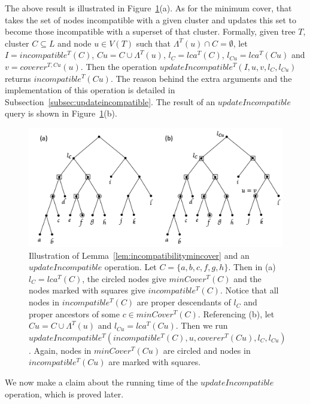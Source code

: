 \documentclass{article}
\newcommand{\leafset}{\Lambda}
\begin{document}
    The above result is illustrated in Figure~\ref{fig:incompatibility}(a). As for the minimum cover, that takes the set of nodes incompatible with a given cluster and updates this set to become those incompatible with a superset of that cluster. Formally, given tree $T$, cluster $C \subseteq L$ and node $u \in V(T)$ such that $\leafset^{T}(u) \cap C = \emptyset$, let $I = incompatible^{T}(C)$, $Cu = C \cup \leafset^{T}(u)$, $l_C = lca^{T}(C)$, $l_{Cu} = lca^{T}(Cu)$ and $v = coverer^{T, Cu}(u)$. Then the operation $updateIncompatible^{T}(I, u, v, l_C, l_{Cu})$ returns $incompatible^{T}(Cu)$. The reason behind the extra arguments and the implementation of this operation is detailed in Subsection~\ref{subsec:updateincompatible}. The result of an $updateIncompatible$ query is shown in Figure~\ref{fig:incompatibility}(b).

    \begin{figure}[ht]
        \includegraphics[scale=0.5]{incompatibility}
        \centering
        \caption[Incompatibility and the $addToCover$ operation]{Illustration of Lemma~\ref{lem:incompatibilitymincover} and an $updateIncompatible$ operation. Let $C = \{a, b, c, f, g, h\}$. Then in (a) $l_C = lca^T(C)$, the circled nodes give $minCover^{T}(C)$ and the nodes marked with squares give $incompatible^T(C)$. Notice that all nodes in $incompatible^T(C)$ are proper descendants of $l_C$ and proper ancestors of some $c \in minCover^{T}(C)$. Referencing (b), let $Cu = C \cup \leafset^{T}(u)$ and $l_{Cu} = lca^{T}(Cu)$. Then we run $updateIncompatible^{T}(incompatible^{T}(C), u, coverer^{T}(Cu), l_C, l_{Cu})$. Again, nodes in $minCover^{T}(Cu)$ are circled and nodes in $incompatible^{T}(Cu)$ are marked with squares.}
        \label{fig:incompatibility}
    \end{figure}

    We now make a claim about the running time of the $updateIncompatible$ operation, which is proved later.
    \newline
\end{document}
